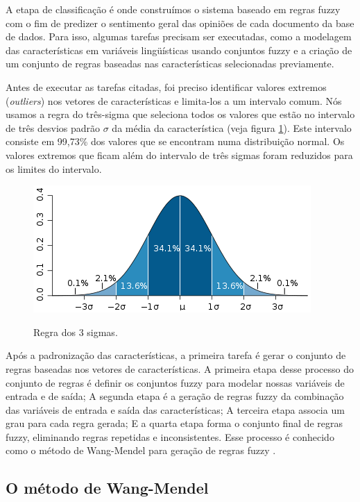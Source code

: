 A etapa de classificação é onde construímos o sistema baseado em regras fuzzy com o fim de predizer o sentimento geral das opiniões de cada documento da base de dados. Para isso, algumas tarefas precisam ser executadas, como a modelagem das características em variáveis lingüísticas usando conjuntos fuzzy \cite{zadeh1965fuzzy} e a criação de um conjunto de regras baseadas nas características selecionadas previamente.

Antes de executar as tarefas citadas, foi preciso identificar valores extremos (\textit{outliers}) nos vetores de características e limita-los a um intervalo comum. Nós usamos a regra do três-sigma \cite{kazmier2004schaum} que seleciona todos os valores que estão no intervalo de três desvios padrão $\sigma$ da média da característica (veja figura \ref{figura:regra_3_sigmas}). Este intervalo consiste em 99,73\% dos valores que se encontram numa distribuição normal. Os valores extremos que ficam além do intervalo de três sigmas foram reduzidos para os limites do intervalo.

\begin{figure}[h]
\caption{Regra dos 3 sigmas.}
\centering
\includegraphics[scale=0.85]{regra-dos-3-sigma.png}
\label{figura:regra_3_sigmas}
\end{figure}

Após a padronização das características, a primeira tarefa é gerar o conjunto de regras baseadas nos vetores de características. A primeira etapa desse processo do conjunto de regras é definir os conjuntos fuzzy para modelar nossas variáveis de entrada e de saída;  A segunda etapa é a geração de regras fuzzy da combinação das variáveis de entrada e saída das características; A terceira etapa associa um grau para cada regra gerada; E a quarta etapa forma o conjunto final de regras fuzzy, eliminando regras repetidas e inconsistentes. Esse processo é conhecido como o método de Wang-Mendel para geração de regras fuzzy \cite{wang1992generating}. 

\subsection{O método de Wang-Mendel}

